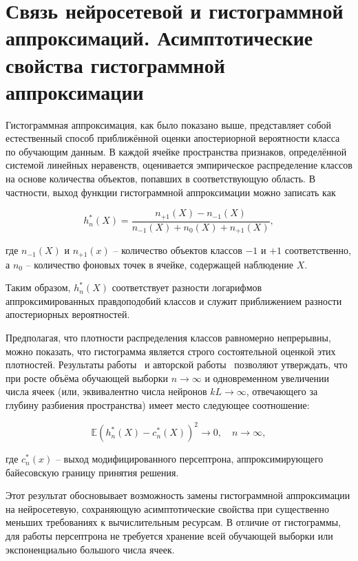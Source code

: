 \section{Связь нейросетевой и гистограммной аппроксимаций. Асимптотические свойства гистограммной аппроксимации}\label{sec:ch1/hist_neural_approximations}

Гистограммная аппроксимация, как было показано выше, представляет собой естественный способ приближённой оценки апостериорной вероятности класса по обучающим данным. В каждой ячейке пространства признаков, определённой системой линейных неравенств, оценивается эмпирическое распределение классов на основе количества объектов, попавших в соответствующую область. В частности, выход функции гистограммной аппроксимации можно записать как

\[
h_n^*(X) = \frac{n_{+1}(X) - n_{-1}(X)}{n_{-1}(X) + n_0(X) + n_{+1}(X)},
\]

где \(n_{-1}(X)\) и \(n_{+1}(x)\) -- количество объектов классов \(-1\) и \(+1\) соответственно, а \(n_0\) -- количество фоновых точек в ячейке, содержащей наблюдение \(X\).

Таким образом, \(h_n^*(X)\) соответствует разности логарифмов аппроксимированных правдоподобий классов и служит приближением разности апостериорных вероятностей.

Предполагая, что плотности распределения классов равномерно непрерывны, можно показать, что гистограмма является строго состоятельной оценкой этих плотностей. Результаты работы~\cite{devroye2013probabilistic} и авторской работы~\cite{eliseev2025convergence} позволяют утверждать, что при росте объёма обучающей выборки \(n \to \infty\) и одновременном увеличении числа ячеек (или, эквивалентно числа нейронов \(kL \to \infty\), отвечающего за глубину разбиения пространства) имеет место следующее соотношение:

\begin{equation}
    \label{eq:binary_consistency}
    \mathbb{E}\left( h_n^*(X) - c_n^*(X) \right)^2 \to 0, \quad n \to \infty,    
\end{equation}

где \(c_n^*(x)\) -- выход модифицированного персептрона, аппроксимирующего байесовскую границу принятия решения.

Этот результат обосновывает возможность замены гистограммной аппроксимации на нейросетевую, сохраняющую асимптотические свойства при существенно меньших требованиях к вычислительным ресурсам. В отличие от гистограммы, для работы персептрона не требуется хранение всей обучающей выборки или экспоненциально большого числа ячеек.

